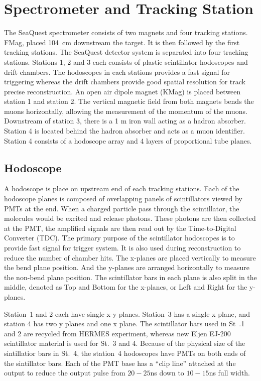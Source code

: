 \documentclass[../main.tex]{subfiles}
\begin{document}
\section{Spectrometer and Tracking Station}
The SeaQuest spectrometer consists of two magnets and four tracking stations. FMag,
placed \SI{104}{\cm} downstream the target. It is then followed by
the first tracking stations. The SeaQuest detector system is separated into four tracking stations.
Stations 1, 2 and 3 each consists of plastic scintillator hodoscopes and drift chambers.
The hodoscopes in each stations provides a fast signal for triggering whereas
the drift chambers provide good spatial resolution for track precise reconstruction.
An open air dipole magnet (KMag) is placed between station 1 and station 2.
The vertical magnetic field from both
magnets bends the muons horizontally, allowing the measurement of the momentum
of the muons. Downstream of station 3, there is a 1 m iron wall acting as a
hadron absorber. Station 4 is located behind the hadron absorber and acts as a
muon identifier. Station 4 consists of a hodoscope array and 4 layers of
proportional tube planes.



\subsection{Hodoscope}
A hodoscope is place on upstream end of each tracking stations. Each of the hodoscope planes
is composed of overlapping panels of scintillators viewed by PMTs at the end.
When a charged particle pass through the scintillator, the molecules would be excited and
release photons. These photons are then collected at the PMT, the amplified signals are
then read out by the Time-to-Digital Converter (TDC).
The primary purpose of the scintillator hodoscopes is to provide fast signal for
trigger system. It is also used during reconstruction to reduce the number of chamber hits.
The x-planes are placed vertically to measure the bend plane position.
And the y-planes are arranged horizontally to measure the non-bend plane position.
The scintillator bars in each plane is also split in the middle, denoted as Top and Bottom
for the x-planes, or Left and Right for the y-planes.

Station~1 and 2 each have single x-y planes. Station~3 has a single x plane, and station
4 has two y planes and one x plane. The scintillator bars used in St~.1 and 2 are recycled
from HERMES experiment, whereas new Eljen EJ-200 scintillator material
is used for St.~3 and 4. Because of the physical size of the sintillatior bars in St.~4, the station~4
hodoscopes have PMTs on both ends of the sintillator bars. Each of the PMT base has a
``clip line'' attached at the output to reduce the output pulse from $20-25$\unit{\ns}
down to $10-15$\unit{\ns} full width.
\end{document}
